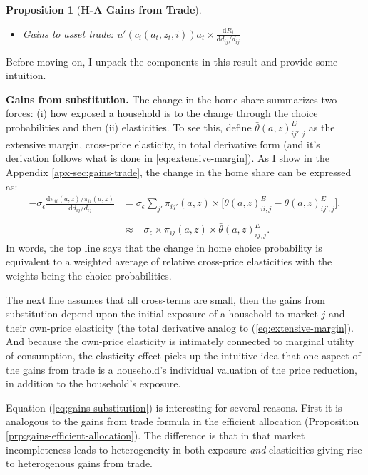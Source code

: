\documentclass[12pt,pdftex]{article}
\newtheorem{prp}{Proposition}
\begin{document}
\begin{onehalfspacing}
\begin{prp}[\textbf{H-A Gains from Trade}]
\begin{itemize}
\item Gains to asset trade: $u'(c_{i}(a_{t},z_{t}, i))a_{t} \times \frac{\mathrm{d} R_{i}}{\mathrm{d} d_{ij} / d_{ij}}$
\end{itemize}
\end{prp}
Before moving on, I unpack the components in this result and provide some intuition.

\textbf{Gains from substitution.} The change in the home share summarizes two forces: (i) how exposed a household is to the change through the choice probabilities and then (ii) elasticities. To see this, define $\bar{\theta}(a,z) ^E_{ij',j}$ as the extensive margin, cross-price elasticity, in total derivative form (and it's derivation follows what is done in \ref{eq:extensive-margin}). As I show in the Appendix \ref{apx-sec:gains-trade}, the change in the home share can be expressed as:
\begin{align}
-\sigma_{\epsilon} \frac{\mathrm{d} \pi_{ii}(a,z) / \pi_{ii}(a,z) }{\mathrm{d} d_{ij} / d_{ij}} &= \sigma_{\epsilon} \sum_{j'} \pi_{ij'}(a,z) \times \bigg[ \bar{\theta}(a,z) ^E_{ii,j} - \bar{\theta}(a,z) ^E_{ij',j}\bigg], \\
\nonumber \\
&\approx
-\sigma_{\epsilon} \times \pi_{ij}(a,z) \times \bar{\theta}(a,z) ^E_{ij,j}.
\label{eq:gains-substitution}
\end{align}
In words, the top line says that the change in home choice probability is equivalent to a weighted average of relative cross-price elasticities with the weights being the choice probabilities.

The next line assumes that all cross-terms are small, then the gains from substitution depend upon the initial exposure of a household to market $j$ and their own-price elasticity (the total derivative analog to (\ref{eq:extensive-margin}). And because the own-price elasticity is intimately connected to marginal utility of consumption, the elasticity effect picks up the intuitive idea that one aspect of the gains from trade is a household's individual valuation of the price reduction, in addition to the household's exposure.

Equation (\ref{eq:gains-substitution}) is interesting for several reasons. First it is analogous to the gains from trade formula in the efficient allocation (Proposition \ref{prp:gains-efficient-allocation}). The difference is that in that market incompleteness leads to heterogeneity in both exposure \emph{and} elasticities giving rise to heterogenous gains from trade.


\end{onehalfspacing}
\end{document}
